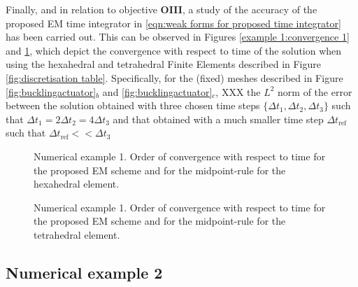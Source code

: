 Finally, and in relation to objective \textbf{OIII}, a study of the accuracy of the proposed EM time integrator in \eqref{eqn:weak forms for proposed time integrator} has been carried out. This can be observed in Figures \ref{example 1:convergence 1} and \ref{example 1:convergence 2}, which 
depict the convergence with respect to time of the solution when using the hexahedral and tetrahedral Finite Elements described in Figure \ref{fig:discretisation table}. Specifically, for the (fixed) meshes described in Figure \ref{fig:bucklingactuator}$_b$ and \ref{fig:bucklingactuator}$_c$, XXX the $L^2$ norm of the error between the solution obtained with three chosen time steps $\{\Delta t_1,\Delta t_2,\Delta t_3\}$ such that $\Delta t_1 = 2\Delta t_2=4\Delta t_3$ and that obtained with a much smaller time step $\Delta {t_{\text{ref}}}$ such that $\Delta {t_{\text{ref}}}<<\Delta t_3$

\begin{figure}[h!]
	\begin{minipage}[b!]{0.475\textwidth}
		\centering
		\setlength{\figH}{0.25\textheight}
		\setlength{\figW}{0.8\textwidth}
		\vspace{-0mm}		
		
		\caption{Numerical example 1. Order of convergence with respect to time for the proposed EM scheme and for the midpoint-rule for the hexahedral element.}
		\label{example 1:convergence 1}
	\end{minipage}
	\hfill
	\begin{minipage}[b!]{0.475\textwidth}
		\centering
		\setlength{\figH}{0.25\textheight}
		\setlength{\figW}{0.8\textwidth}
		\vspace{-2mm}
		
		\caption{Numerical example 1. Order of convergence with respect to time for the proposed EM scheme and for the midpoint-rule for the tetrahedral element.}
		\label{example 1:convergence 2}
	\end{minipage}
\end{figure}



%
%
%
%
%
%
%
%
%
%
%
%
%
\subsection{Numerical example 2}

